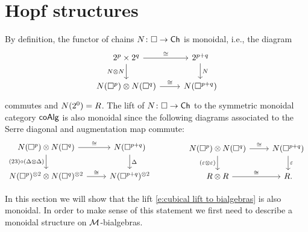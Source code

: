 
\section{Hopf structures}

By definition, the functor of chains $N \colon \square \to \mathsf{Ch}$ is monoidal, i.e., the diagram
\begin{equation*}
\begin{tikzcd}
2^p \times 2^q \arrow[r, "\cong"] \arrow[d, "\cchains \otimes \cchains"']& 2^{p+q} \arrow[d, "\cchains"] \\
\cchains(\cube^p) \otimes \cchains(\cube^q) \arrow[r, "\cong"] & \cchains(\cube^{p+q})
\end{tikzcd}
\end{equation*}
commutes and $N(2^0) = R$.
The lift of  $N \colon \square \to \mathsf{Ch}$ to the symmetric monoidal category $\mathsf{coAlg}$ is also monoidal since the following diagrams associated to the Serre diagonal and augmentation map commute:
\begin{equation*}
\begin{tikzcd}
\cchains(\cube^p) \otimes \cchains(\cube^{q}) \arrow[r, "\cong"] \arrow[d, "(23) \circ (\Delta \otimes \Delta)"'] & \cchains(\cube^{p+q}) \arrow[d, "\Delta"]\\
\cchains(\cube^p)^{\otimes 2} \otimes \cchains(\cube^{q})^{\otimes 2} \arrow[r, "\cong"]& \cchains(\cube^{p+q})^{\otimes 2}
\end{tikzcd}
\qquad \qquad
\begin{tikzcd}
\cchains(\cube^p) \otimes \cchains(\cube^{q}) \arrow[r, "\cong"] \arrow[d, "(\varepsilon \otimes \varepsilon)"'] & \cchains(\cube^{p+q}) \arrow[d, "\varepsilon"] \\
R \otimes R \arrow[r, "\cong"] & R.
\end{tikzcd}
\end{equation*}

In this section we will show that the lift \eqref{e:cubical lift to bialgebras} is also monoidal.
In order to make sense of this statement we first need to describe a monoidal structure on $\mathcal{M}$-bialgebras.

